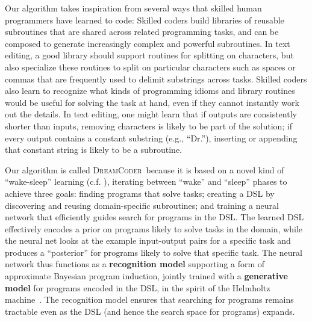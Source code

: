 \documentclass{article}
\newcommand{\system}{\textsc{DreamCoder}~}
\begin{document}

Our algorithm takes inspiration from several ways that skilled human
programmers have learned to code: Skilled coders build libraries of
reusable subroutines that are shared across related programming tasks,
and can be composed to generate increasingly complex and powerful
subroutines.  In text editing, a good library should support routines
for splitting on characters, but also specialize these routines to
split on particular characters such as spaces or commas that are
frequently used to delimit substrings across tasks.  Skilled coders
also learn to recognize what kinds of programming idioms and library
routines would be useful for solving the task at hand, even if they
cannot instantly work out the details.  In text editing, one might
learn that if outputs are consistently shorter than inputs, removing
characters is likely to be part of the solution; if every output
contains a constant substring (e.g., ``Dr.''), inserting or appending
that constant string is likely to be a subroutine.

Our algorithm is called \system because it is based on a
novel kind of ``wake-sleep'' learning (c.f. \cite{hinton1995wake}), iterating
between ``wake'' and ``sleep'' phases to achieve three goals: finding
programs that solve tasks; creating a DSL by discovering
and reusing domain-specific subroutines; and training a neural network
that efficiently guides search for programs in the DSL.
The learned DSL effectively encodes a prior on programs likely to
solve tasks in the domain, while the neural net looks at the example
input-output pairs for a specific task and produces a ``posterior''
for programs likely to solve that specific task.  The neural network
thus functions as a \textbf{recognition model} supporting a form of
approximate Bayesian program induction, jointly trained with a
\textbf{generative model} for programs encoded in the DSL, in the
spirit of the Helmholtz machine~\cite{hinton1995wake}. The
recognition model ensures that searching for programs remains
tractable even as the DSL (and hence the search space for programs)
expands.
\end{document}
